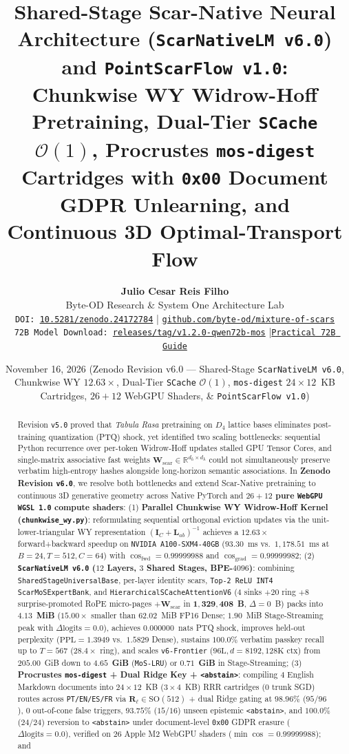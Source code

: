 \documentclass[10pt,twocolumn]{article}
\title{\textbf{Shared-Stage Scar-Native Neural Architecture (\texttt{ScarNativeLM v6.0}) and \texttt{PointScarFlow v1.0}:\\Chunkwise WY Widrow-Hoff Pretraining, Dual-Tier \texttt{SCache} $\mathcal{O}(1)$, Procrustes \texttt{mos-digest} Cartridges with \texttt{0x00} Document GDPR Unlearning, and Continuous 3D Optimal-Transport Flow}}
\author{
  \textbf{Julio Cesar Reis Filho}\\
  Byte-OD Research \& System One Architecture Lab\\
  \texttt{DOI: \href{https://doi.org/10.5281/zenodo.24172784}{10.5281/zenodo.24172784}} \quad|\quad
  \texttt{\href{https://github.com/byte-od/mixture-of-scars}{github.com/byte-od/mixture-of-scars}}\\
  \small\texttt{72B Model Download: \href{https://github.com/byte-od/mixture-of-scars/releases/tag/v1.2.0-qwen72b-mos}{releases/tag/v1.2.0-qwen72b-mos}} \quad|\quad \texttt{\href{https://github.com/byte-od/mixture-of-scars/blob/main/docs/GUIA_PRATICO_MOS_SCACHE_72B.md}{Practical 72B Guide}}
}
\date{November 16, 2026 \quad (Zenodo Revision v6.0 --- Shared-Stage \texttt{ScarNativeLM v6.0}, Chunkwise WY $12.63\times$, Dual-Tier \texttt{SCache} $\mathcal{O}(1)$, \texttt{mos-digest} $24\times 12$~KB Cartridges, $26+12$ WebGPU Shaders, \& \texttt{PointScarFlow v1.0})}
\begin{document}
\maketitle

\begin{abstract}
Revision \texttt{v5.0} proved that \emph{Tabula Rasa} pretraining on $D_4$ lattice bases eliminates post-training quantization (PTQ) shock, yet identified two scaling bottlenecks: sequential Python recurrence over per-token Widrow-Hoff updates stalled GPU Tensor Cores, and single-matrix associative fast weights $\mathbf{W}_{\text{scar}} \in \mathbb{R}^{d_h \times d_h}$ could not simultaneously preserve verbatim high-entropy hashes alongside long-horizon semantic associations. In \textbf{Zenodo Revision \texttt{v6.0}}, we resolve both bottlenecks and extend Scar-Native pretraining to continuous 3D generative geometry across Native PyTorch and \textbf{$26 + 12$ pure \texttt{WebGPU WGSL 1.0} compute shaders}:
(1) \textbf{Parallel Chunkwise WY Widrow-Hoff Kernel (\texttt{chunkwise\_wy.py})}: reformulating sequential orthogonal eviction updates via the unit-lower-triangular WY representation $(\mathbf{I}_C + \mathbf{L}_{ab})^{-1}$ achieves a $\mathbf{12.63\times}$ forward+backward speedup on \texttt{NVIDIA A100-SXM4-40GB} ($93.30$~ms vs.\ $1{,}178.51$~ms at $B=24, T=512, C=64$) with $\cos_{\text{fwd}}=\mathbf{0.99999988}$ and $\cos_{\text{grad}}=\mathbf{0.99999982}$;
(2) \textbf{\texttt{ScarNativeLM v6.0} ($12$ Layers, $3$ Shared Stages, BPE-$4096$)}: combining \texttt{SharedStageUniversalBase}, per-layer identity scars, \texttt{Top-2 ReLU INT4} \texttt{ScarMoSExpertBank}, and \texttt{HierarchicalSCacheAttentionV6} ($4$ sinks $+ 20$ ring $+ 8$ surprise-promoted RoPE micro-pages $+ \mathbf{W}_{\text{scar}}$ in $\mathbf{1{,}329{,}408}$~\textbf{B}, $\Delta=0$~B) packs into $\mathbf{4.13}$~\textbf{MiB} ($15.00\times$ smaller than $62.02$~MiB FP16 Dense; $1.90$~MiB Stage-Streaming peak with $\Delta\text{logits}=\mathbf{0.0}$), achieves $\mathbf{0.000000}$~nats PTQ shock, improves held-out perplexity ($\mathrm{PPL}=\mathbf{1.3949}$ vs.\ $1.5829$ Dense), sustains $\mathbf{100.0\%}$ verbatim passkey recall up to $T=567$ ($28.4\times$ ring), and scales \texttt{v6-Frontier} ($96\text{L}, d=8192, 128\text{K}$ ctx) from $205.00$~GiB down to $\mathbf{4.65}$~\textbf{GiB} (\texttt{MoS-LRU}) or $\mathbf{0.71}$~\textbf{GiB} in Stage-Streaming;
(3) \textbf{Procrustes \texttt{mos-digest} + Dual Ridge Key + \texttt{<abstain>}}: compiling $4$ English Markdown documents into $24 \times 12$~KB ($3\times 4$~KB) RRR cartridges ($0$ trunk SGD) routes across \texttt{PT/EN/ES/FR} via $\mathbf{R}_\ell \in \mathrm{SO}(512)$ + dual Ridge gating at $\mathbf{98.96\%}$ ($95/96$), $0$ out-of-cone false triggers, $\mathbf{93.75\%}$ ($15/16$) unseen epistemic \texttt{<abstain>}, and $\mathbf{100.0\%}$ ($24/24$) reversion to \texttt{<abstain>} under document-level \texttt{0x00} GDPR erasure ($\Delta\text{logits}=0.0$), verified on $26$ Apple M2 WebGPU shaders ($\min\cos=\mathbf{0.99999988}$); and

\end{abstract}
\end{document}
